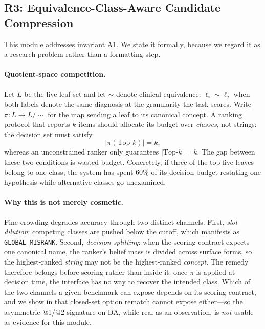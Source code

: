 \subsection{R3: Equivalence-Class-Aware Candidate Compression}
\label{sec:m3}

This module addresses invariant A1.
We state it formally, because we regard it as a research problem rather than a formatting step.

\paragraph{Quotient-space competition.}
Let $L$ be the live leaf set and let $\sim$ denote clinical equivalence: $\ell_i \sim \ell_j$ when both labels denote the same diagnosis at the granularity the task scores.
Write $\pi: L \rightarrow L/\!\sim$ for the map sending a leaf to its canonical concept.
A ranking protocol that reports $k$ items should allocate its budget over \emph{classes}, not strings: the decision set must satisfy
\[
\bigl|\pi(\text{Top-}k)\bigr| = k ,
\]
whereas an unconstrained ranker only guarantees $|\text{Top-}k| = k$.
The gap between these two conditions is wasted budget.
Concretely, if three of the top five leaves belong to one class, the system has spent $60\%$ of its decision budget restating one hypothesis while alternative classes go unexamined.

\paragraph{Why this is not merely cosmetic.}
Fine crowding degrades accuracy through two distinct channels.
First, \emph{slot dilution}: competing classes are pushed below the cutoff, which manifests as \texttt{GLOBAL\_MISRANK}.
Second, \emph{decision splitting}: when the scoring contract expects one canonical name, the ranker's belief mass is divided across surface forms, so the highest-ranked \emph{string} may not be the highest-ranked \emph{concept}.
The remedy therefore belongs before scoring rather than inside it: once $\pi$ is applied at decision time, the interface has no way to recover the intended class.
Which of the two channels a given benchmark can expose depends on its scoring contract, and we show in  that closed-set option rematch cannot expose either---so the asymmetric @1/@2 signature on DA, while real as an observation, is \emph{not} usable as evidence for this module.

